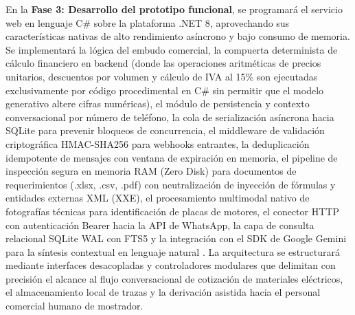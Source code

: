 En la \textbf{Fase 3: Desarrollo del prototipo funcional}, se programará el servicio web en lenguaje C\# sobre la plataforma .NET 8, aprovechando sus características nativas de alto rendimiento asíncrono y bajo consumo de memoria. Se implementará la lógica del embudo comercial, la compuerta determinista de cálculo financiero en backend (donde las operaciones aritméticas de precios unitarios, descuentos por volumen y cálculo de IVA al 15\% son ejecutadas exclusivamente por código procedimental en C\# sin permitir que el modelo generativo altere cifras numéricas), el módulo de persistencia y contexto conversacional por número de teléfono, la cola de serialización asíncrona hacia SQLite para prevenir bloqueos de concurrencia, el middleware de validación criptográfica HMAC-SHA256 para webhooks entrantes, la deduplicación idempotente de mensajes con ventana de expiración en memoria, el pipeline de inspección segura en memoria RAM (Zero Disk) para documentos de requerimientos (.xlsx, .csv, .pdf) con neutralización de inyección de fórmulas y entidades externas XML (XXE), el procesamiento multimodal nativo de fotografías técnicas para identificación de placas de motores, el conector HTTP con autenticación Bearer hacia la API de WhatsApp, la capa de consulta relacional SQLite WAL con FTS5 y la integración con el SDK de Google Gemini para la síntesis contextual en lenguaje natural \parencite{educsci14121330}. La arquitectura se estructurará mediante interfaces desacopladas y controladores modulares que delimitan con precisión el alcance al flujo conversacional de cotización de materiales eléctricos, el almacenamiento local de trazas y la derivación asistida hacia el personal comercial humano de mostrador.

